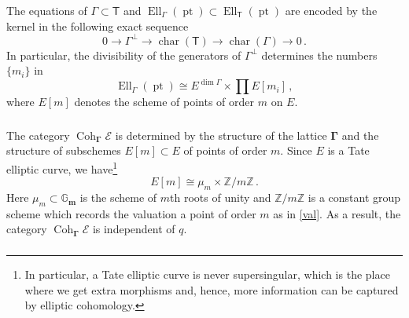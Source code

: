 \documentclass[14pt]{extarticle}
\newcommand{\Gm}{\mathbb{G}_\mathbf{m}}
\newcommand{\Z}{\mathbb{Z}}
\newcommand{\bT}{\mathsf{T}}
\newcommand{\bX}{\mathsf{X}}
\newcommand{\cE}{\mathscr{E}}
\newcommand{\bGamma}{\boldsymbol{\Gamma}}
\newcommand{\fS}{\mathfrak{S}}
\DeclareMathOperator{\Coh}{Coh}
\DeclareMathOperator{\Ell}{Ell}
\DeclareMathOperator{\chr}{char}
\DeclareMathOperator{\pt}{pt}
\theoremstyle{definition}
\begin{document}
\subsubsection{}


The equations of $\Gamma\subset \bT$  and
$\Ell_\Gamma(\pt) \subset \Ell_\bT(\pt)$ are encoded by the
kernel in the following exact
sequence
$$
0 \to \Gamma^\perp \to \chr(\bT) \to \chr(\Gamma) \to 0 \,. 
$$
In particular, the divisibility of the generators of $\Gamma^\perp$
determines the numbers $\{m_i\}$ in
%
\begin{equation}
\Ell_\Gamma(\pt) \cong E^{\dim \Gamma} \times \prod
E[m_i]\label{EllGa} \,, 
\end{equation}
%
where  $E[m]$ denotes the scheme of points
of order $m$ on $E$. 


\subsubsection{}





 The category $\Coh_{\bGamma} \cE$ is determined by the structure of the
 lattice $\bGamma$ and the structure of subschemes $E[m] \subset E$ of
 points of order $m$. Since $E$ is a Tate elliptic
curve, we have\footnote{In particular, a Tate
  elliptic curve is never supersingular, which is the place where we
  get extra morphisms and, hence, more information can be captured by
  elliptic cohomology.}
$$
E[m] \cong \mu_m \times \Z/m \Z \,. 
$$
Here $\mu_m \subset \Gm$ is the scheme of $m$th roots of unity and
$\Z/m \Z$ is a constant group scheme which records the valuation a
point of order $m$ as in \eqref{val}. As a result, the category $\Coh_{\bGamma} \cE$ is
independent of $q$. 





















\subsubsection{}
\end{document}
